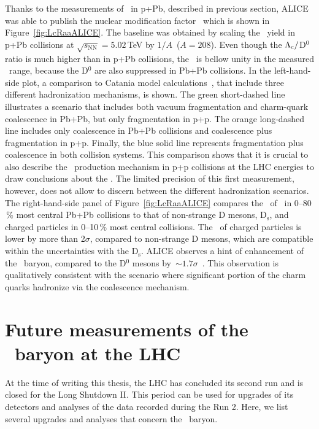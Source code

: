 Thanks to the measurements of \Lambdac\ in p+Pb, described in previous section, ALICE was able to publish the nuclear modification factor \Raa\ which is shown in Figure~\ref{fig:LcRaaALICE}\@. The baseline was obtained by scaling the \Lambdac\ yield in p+Pb collisions at $\sqrt{s_\mathrm{NN}} = 5.02\,$TeV by $1/A$\ ($A=208$)\@. Even though the ${\Lambda_\text{c}}/$D$^0$ ratio is much higher than in p+Pb collisions, the \Raa\ is bellow unity in the measured \pt\ range, because the D$^0$ are also suppressed in Pb+Pb collisions. 
In the left-hand-side plot, a comparison to Catania model calculations~\cite{Catania}, that include three different hadronization mechanisms, is shown. The green short-dashed line illustrates a scenario that includes both vacuum fragmentation and charm-quark coalescence in Pb+Pb, but only fragmentation in p+p. The orange long-dashed line includes only coalescence in Pb+Pb collisions and coalescence plus fragmentation in p+p. Finally, the blue solid line represents fragmentation plus coalescence in both collision systems. This comparison shows that it is crucial to also describe the \Lambdac\ production mechanism in p+p collisions at the LHC energies to draw conclusions about the \Raa\@. The limited precision of this first measurement, however, does not allow to discern between the different hadronization scenarios.
The right-hand-side panel of Figure~\ref{fig:LcRaaALICE} compares the \Raa\ of \Lambdac\ in 0--80$\,\%$ most central Pb+Pb collisions to that of non-strange D mesons, D$_\mathrm{s}$, and charged particles in 0--10$\,\%$ most central collisions. The \Raa\ of charged particles is lower by more than 2$\sigma$, compared to non-strange D mesons, which are compatible within the uncertainties with the D$_\mathrm{s}$\@. ALICE observes a hint of enhancement of the \Lambdac\ baryon, compared to the D$^0$ mesons by~$\sim1.7\sigma$~\cite{AlicePbPb}\@. This observation is qualitatively consistent with the scenario where significant portion of the charm quarks hadronize via the coalescence mechanism.

\section{Future measurements of the \Lambdac\ baryon at the LHC}
At the time of writing this thesis, the LHC has concluded its second run and is closed for the Long Shutdown II\@. This period can be used for upgrades of its detectors and analyses of the data recorded during the Run 2\@. Here, we list several upgrades and analyses that concern the \Lambdac\ baryon.


